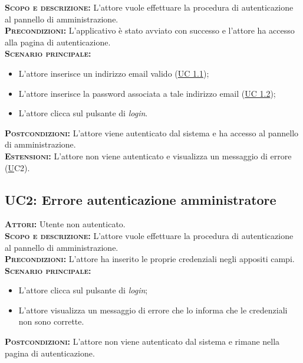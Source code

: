 \textsc{\textbf{Scopo e descrizione:}} L'attore vuole effettuare la procedura di autenticazione al pannello di amministrazione.\\
\textsc{\textsc{\textbf{Precondizioni:}}} L'applicativo è stato avviato con successo e l'attore ha accesso alla pagina di autenticazione.\\
\textsc{\textbf{Scenario principale:}}
\begin{itemize}
    \item L'attore inserisce un indirizzo email valido (\hyperref[sec:uc11]{UC 1.1});
    \item L'attore inserisce la password associata a tale indirizzo email (\hyperref[sec:uc12]{UC 1.2});
    \item L'attore clicca sul pulsante di \textit{login}.
\end{itemize}
\textsc{\textbf{Postcondizioni:}} L'attore viene autenticato dal sistema e ha accesso al pannello di amministrazione.\\
\textsc{\textbf{Estensioni:}} L'attore non viene autenticato e visualizza un messaggio di errore (\hyperref[sec:uc2]UC2{}).

\subsection{UC2: Errore autenticazione amministratore}
\label{sec:uc2}
\textsc{\textbf{Attori:}} Utente non autenticato.\\
\textsc{\textbf{Scopo e descrizione:}} L'attore vuole effettuare la procedura di autenticazione al pannello di amministrazione.\\
\textsc{\textsc{\textbf{Precondizioni:}}} L'attore ha inserito le proprie credenziali negli appositi campi.\\
\textsc{\textbf{Scenario principale:}}
\begin{itemize}
    \item L'attore clicca sul pulsante di \textit{login};
    \item L'attore visualizza un messaggio di errore che lo informa che le credenziali non sono corrette.
\end{itemize}
\textsc{\textbf{Postcondizioni:}} L'attore non viene autenticato dal sistema e rimane nella pagina di autenticazione.

